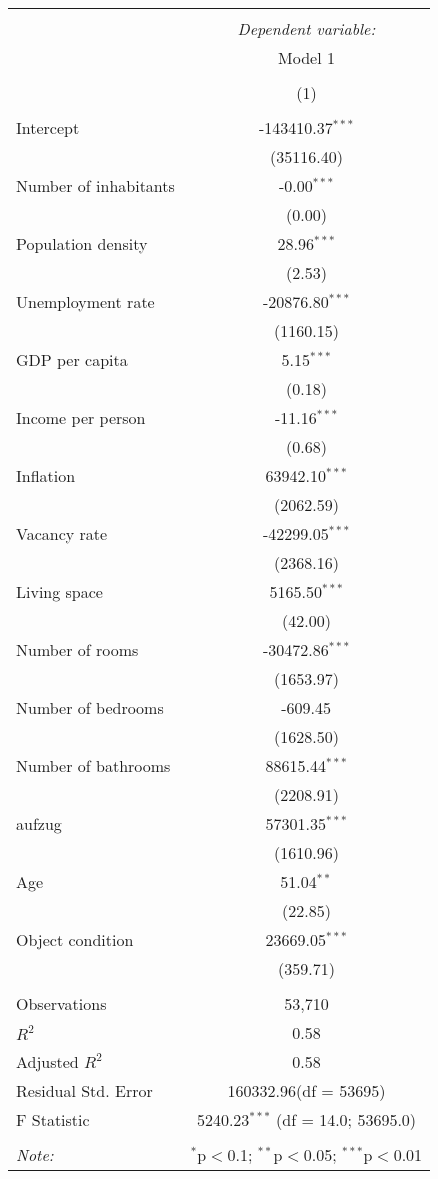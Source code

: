 \begin{table}[!htbp] \centering
\begin{tabular}{@{\extracolsep{5pt}}lc}
\\[-1.8ex]\hline
\hline \\[-1.8ex]
& \multicolumn{1}{c}{\textit{Dependent variable:}} \
\cr \cline{1-2}
\\[-1.8ex] & \multicolumn{1}{c}{Model 1} \\\\[-1.8ex] & (1) \\
\hline \\[-1.8ex]
 Intercept & -143410.37$^{***}$ \\
  & (35116.40) \\
 Number of inhabitants & -0.00$^{***}$ \\
  & (0.00) \\
 Population density & 28.96$^{***}$ \\
  & (2.53) \\
 Unemployment rate & -20876.80$^{***}$ \\
  & (1160.15) \\
 GDP per capita & 5.15$^{***}$ \\
  & (0.18) \\
 Income per person & -11.16$^{***}$ \\
  & (0.68) \\
 Inflation & 63942.10$^{***}$ \\
  & (2062.59) \\
 Vacancy rate & -42299.05$^{***}$ \\
  & (2368.16) \\
 Living space & 5165.50$^{***}$ \\
  & (42.00) \\
 Number of rooms & -30472.86$^{***}$ \\
  & (1653.97) \\
 Number of bedrooms & -609.45$^{}$ \\
  & (1628.50) \\
 Number of bathrooms & 88615.44$^{***}$ \\
  & (2208.91) \\
 aufzug & 57301.35$^{***}$ \\
  & (1610.96) \\
 Age & 51.04$^{**}$ \\
  & (22.85) \\
 Object condition & 23669.05$^{***}$ \\
  & (359.71) \\
\hline \\[-1.8ex]
 Observations & 53,710 \\
 $R^2$ & 0.58 \\
 Adjusted $R^2$ & 0.58 \\
 Residual Std. Error & 160332.96(df = 53695)  \\
 F Statistic & 5240.23$^{***}$ (df = 14.0; 53695.0) \\
\hline
\hline \\[-1.8ex]
\textit{Note:} & \multicolumn{1}{r}{$^{*}$p$<$0.1; $^{**}$p$<$0.05; $^{***}$p$<$0.01} \\
\end{tabular}
\end{table}
